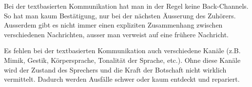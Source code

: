 Bei der textbasierten Kommunikation hat man in der Regel keine Back-Channels. So hat man
kaum Bestätigung, nur bei der nächsten Äusserung des Zuhörers. Ausserdem gibt es nicht immer
einen expliziten Zusammenhang zwischen verschiedenen Nachrichten, ausser man verweist auf eine frühere Nachricht.

Es fehlen bei der textbasierten Kommunikation auch verschiedene Kanäle (z.B. Mimik, Gestik, Körpersprache, Tonalität der Sprache, etc.).
Ohne diese Kanäle wird der Zustand des Sprechers und die Kraft der Botschaft nicht wirklich vermittelt.
Dadurch werden Ausfälle schwer oder kaum entdeckt und repariert.

